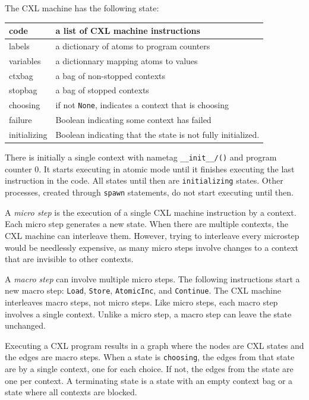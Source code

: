 \documentclass{report}
\begin{document}
The CXL machine has the following state:

\vspace{1em}
\begin{tabular}{|l|l|}
\hline
code & a list of CXL machine instructions \\
\hline
labels & a dictionary of atoms to program counters \\
\hline
variables & a dictionnary mapping atoms to values \\
\hline
ctxbag & a bag of non-stopped contexts \\
\hline
stopbag & a bag of stopped contexts \\
\hline
choosing & if not \texttt{None}, indicates a context that is choosing \\
\hline
failure & Boolean indicating some context has failed \\
\hline
initializing & Boolean indicating that the state is not fully initialized. \\
\hline
\end{tabular}
\vspace{1em}

There is initially a single context with nametag
\texttt{\_\_init\_\_/()} and program counter 0.  It starts executing
in atomic mode until it finishes executing the last instruction in
the code.  All states until then are \texttt{initializing} states.
Other processes, created through \texttt{spawn} statements, do not
start executing until then.

A \emph{micro step}
is the execution of a single CXL machine instruction
by a context.
Each micro step generates a new state.
When there are multiple contexts, the CXL machine can interleave them.
However, trying to interleave every microstep would be needlessly expensive,
as many micro steps involve changes to a context that are invisible to
other contexts.

A \emph{macro step}
can involve multiple micro steps.  The following
instructions start a new macro step: \texttt{Load}, \texttt{Store},
\texttt{AtomicInc}, and \texttt{Continue}.  The CXL machine
interleaves macro steps, not micro steps.  Like micro steps, each
macro step involves a single context.  Unlike a micro step, a macro
step can leave the state unchanged.

Executing a CXL program results in a graph where the nodes are CXL
states and the edges are macro steps.
When a state is \texttt{choosing}, the edges from that state are
by a single context, one for each choice.  If not, the edges from
the state are one per context.
A terminating state is a state with an empty context bag or a state
where all contexts are blocked.

\printindex

\printglossaries
\end{document}
